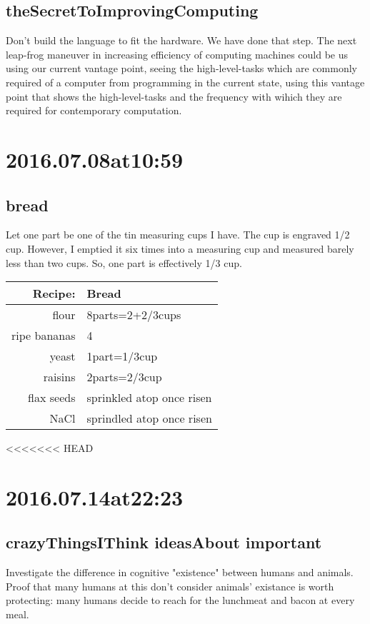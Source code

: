 \subsection*{ theSecretToImprovingComputing }
Don't build the language to fit the hardware. We have done that step. The next leap-frog maneuver in increasing efficiency of computing machines could be us using our current vantage point, seeing the high-level-tasks which are commonly required of a computer from programming in the current state, using this vantage point that shows the high-level-tasks and the frequency with wihich they are required for contemporary computation.

\section*{ 2016.07.08at10:59 }
\subsection*{ bread }
Let one part be one of the tin measuring cups I have. The cup is engraved 1/2 cup. However, I emptied it six times into a measuring cup and measured barely less than two cups. So, one part is effectively 1/3 cup.
\begin{center}
\begin{tabular}{|r|l|}
\hline
Recipe:&Bread\\
\hline
flour           &   8parts=2+2/3cups\\
ripe bananas    &   4\\
yeast           &   1part=1/3cup\\
raisins         &   2parts=2/3cup\\
flax seeds      &   sprinkled atop once risen\\
NaCl            &   sprindled atop once risen\\
\hline
\end{tabular}
\end{center}
<<<<<<< HEAD

\section*{ 2016.07.14at22:23 }
\subsection*{ crazyThingsIThink ideasAbout important }
Investigate the difference in cognitive "existence" between humans and animals. Proof that many humans at this don't consider animals' existance is worth protecting: many humans decide to reach for the lunchmeat and bacon at every meal.

